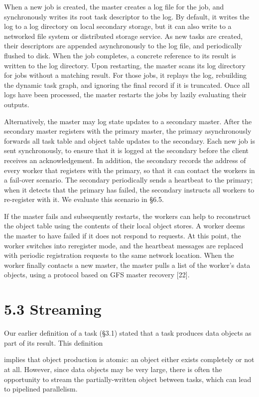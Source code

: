 \documentclass[
]{article}
\begin{document}
When a new job is created, the master creates a log file for the job,
and synchronously writes its root task descriptor to the log. By
default, it writes the log to a log directory on local secondary
storage, but it can also write to a networked file system or distributed
storage service. As new tasks are created, their descriptors are
appended asynchronously to the log file, and periodically flushed to
disk. When the job completes, a concrete reference to its result is
written to the log directory. Upon restarting, the master scans its log
directory for jobs without a matching result. For those jobs, it replays
the log, rebuilding the dynamic task graph, and ignoring the final
record if it is truncated. Once all logs have been processed, the master
restarts the jobs by lazily evaluating their outputs.

Alternatively, the master may log state updates to a secondary master.
After the secondary master registers with the primary master, the
primary asynchronously forwards all task table and object table updates
to the secondary. Each new job is sent synchronously, to ensure that it
is logged at the secondary before the client receives an
acknowledgement. In addition, the secondary records the address of every
worker that registers with the primary, so that it can contact the
workers in a fail-over scenario. The secondary periodically sends a
heartbeat to the primary; when it detects that the primary has failed,
the secondary instructs all workers to re-register with it. We evaluate
this scenario in §6.5.

If the master fails and subsequently restarts, the workers can help to
reconstruct the object table using the contents of their local object
stores. A worker deems the master to have failed if it does not respond
to requests. At this point, the worker switches into reregister mode,
and the heartbeat messages are replaced with periodic registration
requests to the same network location. When the worker finally contacts
a new master, the master pulls a list of the worker's data objects,
using a protocol based on GFS master recovery {[}22{]}.

\section{5.3 Streaming}\label{streaming}

Our earlier definition of a task (§3.1) stated that a task produces data
objects as part of its result. This definition

implies that object production is atomic: an object either exists
completely or not at all. However, since data objects may be very large,
there is often the opportunity to stream the partially-written object
between tasks, which can lead to pipelined parallelism.
\end{document}
